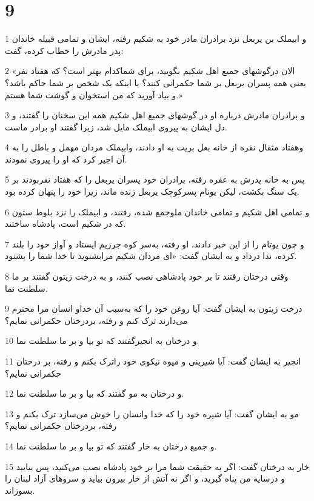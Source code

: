 \chapter{9}

\par 1 و ابیملک بن یربعل نزد برادران مادر خود به شکیم رفته، ایشان و تمامی قبیله خاندان پدر مادرش را خطاب کرده، گفت:
\par 2 «الان درگوشهای جمیع اهل شکیم بگویید، برای شماکدام بهتر است؟ که هفتاد نفر یعنی همه پسران یربعل بر شما حکمرانی کنند؟ یا اینکه یک شخص بر شما حاکم باشد؟ و بیاد آورید که من استخوان و گوشت شما هستم.»
\par 3 و برادران مادرش درباره او در گوشهای جمیع اهل شکیم همه این سخنان را گفتند، و دل ایشان به پیروی ابیملک مایل شد، زیرا گفتند او برادر ماست.
\par 4 وهفتاد مثقال نقره از خانه بعل بریت به او دادند، وابیملک مردان مهمل و باطل را به آن اجیر کرد که او را پیروی نمودند.
\par 5 پس به خانه پدرش به عفره رفته، برادران خود پسران یربعل را که هفتاد نفربودند بر یک سنگ بکشت، لیکن یونام پسرکوچک یربعل زنده ماند، زیرا خود را پنهان کرده بود.
\par 6 و تمامی اهل شکیم و تمامی خاندان ملوجمع شده، رفتند، و ابیملک را نزد بلوط ستون که در شکیم است، پادشاه ساختند.
\par 7 و چون یوتام را از این خبر دادند، او رفته، به‌سر کوه جرزیم ایستاد و آواز خود را بلند کرده، ندا در‌داد و به ایشان گفت: «ای مردان شکیم مرابشنوید تا خدا شما را بشنود.
\par 8 وقتی درختان رفتند تا بر خود پادشاهی نصب کنند، و به درخت زیتون گفتند بر ما سلطنت نما.
\par 9 درخت زیتون به ایشان گفت: آیا روغن خود را که به‌سبب آن خداو انسان مرا محترم می‌دارند ترک کنم و رفته، بردرختان حکمرانی نمایم؟
\par 10 و درختان به انجیرگفتند که تو بیا و بر ما سلطنت نما.
\par 11 انجیر به ایشان گفت: آیا شیرینی و میوه نیکوی خود راترک بکنم و رفته، بر درختان حکمرانی نمایم؟
\par 12 و درختان به مو گفتند که بیا و بر ما سلطنت نما.
\par 13 مو به ایشان گفت: آیا شیره خود را که خدا وانسان را خوش می‌سازد ترک بکنم و رفته، بردرختان حکمرانی نمایم؟
\par 14 و جمیع درختان به خار گفتند که تو بیا و بر ما سلطنت نما.
\par 15 خار به درختان گفت: اگر به حقیقت شما مرا بر خود پادشاه نصب می‌کنید، پس بیایید و درسایه من پناه گیرید، و اگر نه آتش از خار بیرون بیاید و سروهای آزاد لبنان را بسوزاند.

